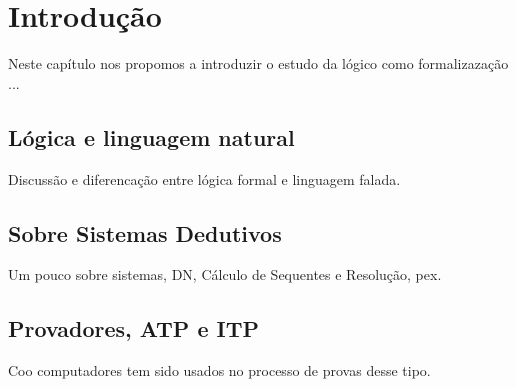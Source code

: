 \chapter{Introdução}
Neste capítulo nos propomos a introduzir o estudo da lógico como formalizazação ...

\section{Lógica e linguagem natural}
Discussão e diferencação entre lógica formal e linguagem falada.

\section{Sobre Sistemas Dedutivos}
Um pouco sobre sistemas, DN, Cálculo de Sequentes e Resolução, pex.

\section{Provadores, ATP e ITP}
Coo computadores tem sido usados no processo de provas desse tipo.
